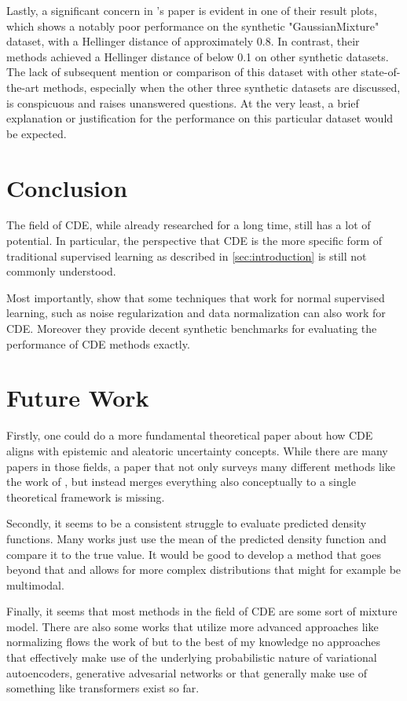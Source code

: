 \documentclass{article}
\begin{document}
Lastly, a significant concern in \citep{rothfuss2019conditional}'s paper is evident in one of their result plots, which shows a notably poor performance on the synthetic "GaussianMixture" dataset, with a Hellinger distance of approximately 0.8. In contrast, their methods achieved a Hellinger distance of below 0.1 on other synthetic datasets. The lack of subsequent mention or comparison of this dataset with other state-of-the-art methods, especially when the other three synthetic datasets are discussed, is conspicuous and raises unanswered questions. At the very least, a brief explanation or justification for the performance on this particular dataset would be expected.

\section{Conclusion}
The field of CDE, while already researched for a long time, still has a lot of potential. In particular, the perspective that CDE is the more specific form of traditional supervised learning as described in \ref{sec:introduction} is still not commonly understood.

Most importantly, \citep{rothfuss2019conditional} show that some techniques that work for normal supervised learning, such as noise regularization and data normalization can also work for CDE. Moreover they provide decent synthetic benchmarks for evaluating the performance of CDE methods exactly.

\section{Future Work}
Firstly, one could do a more fundamental theoretical paper about how CDE aligns with epistemic and aleatoric uncertainty concepts. While there are many papers in those fields, a paper that not only surveys many different methods like the work of \citep{hullermeier_aleatoric_2021}, but instead merges everything also conceptually to a single theoretical framework is missing.

Secondly, it seems to be a consistent struggle to evaluate predicted density functions. Many works just use the mean of the predicted density function and compare it to the true value. It would be good to develop a method that goes beyond that and allows for more complex distributions that might for example be multimodal.

Finally, it seems that most methods in the field of CDE are some sort of mixture model. There are also some works that utilize more advanced approaches like normalizing flows the work of \citep{trippe2018conditional} but to the best of my knowledge no approaches that effectively make use of the underlying probabilistic nature of variational autoencoders, generative advesarial networks or that generally make use of something like transformers exist so far.


\end{document}
